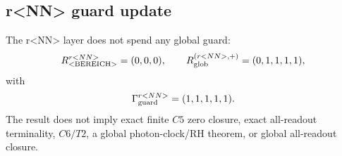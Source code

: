 \subsection*{r<NN> guard update}
\label{subsec:r<NN>-guard-update}

The r<NN> layer does not spend any global guard:
\[
R_{\rm <BEREICH>}^{r<NN>}=(0,0,0),
\qquad
R_{\rm glob}^{(r<NN>,+)}=(0,1,1,1,1),
\]
with
\[
\Gamma_{\rm guard}^{r<NN>}=(1,1,1,1,1).
\]
The result does not imply exact finite \(C5\) zero closure, exact all-readout terminality,
\(C6/T2\), a global photon-clock/RH theorem, or global all-readout closure.

